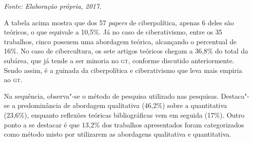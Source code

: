 
\begin{center}
{\footnotesize\emph{Fonte: Elaboração própria, 2017.}}
\end{center}

A tabela acima mostra que dos 57 \emph{papers} de ciberpolítica, apenas
6 deles são teóricos, o que equivale a 10,5\%. Já no caso de
ciberativismo, entre os 35 trabalhos, cinco possuem uma abordagem
teórica, alcançando o percentual de 16\%. No caso de cibercultura, os
sete artigos teóricos chegam a 36,8\% do total da subárea, que já tende
a ser minoria no \textsc{gt}, conforme discutido anteriormente. Sendo assim, é a
guinada da ciberpolítica e ciberativismo que leva mais empiria ao \textsc{gt}.

Na sequência, observa"-se o método de pesquisa utilizado nas pesquisas.
Destaca"-se a predominância de abordagem qualitativa (46,2\%) sobre a
quantitativa (23,6\%), enquanto reflexões teóricas bibliográficas vem em
seguida (17\%). Outro ponto a se destacar é que 13,2\% dos trabalhos
apresentados foram categorizados como método misto por utilizarem as
abordagens qualitativa e quantitativa.

